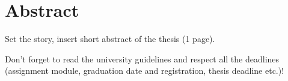  \chapter*{\textbf{Abstract}}

Set the story, insert short abstract of the thesis (1 page).

Don’t forget to read the university guidelines and respect all the deadlines (assignment module, graduation date and registration, thesis deadline etc.)!
